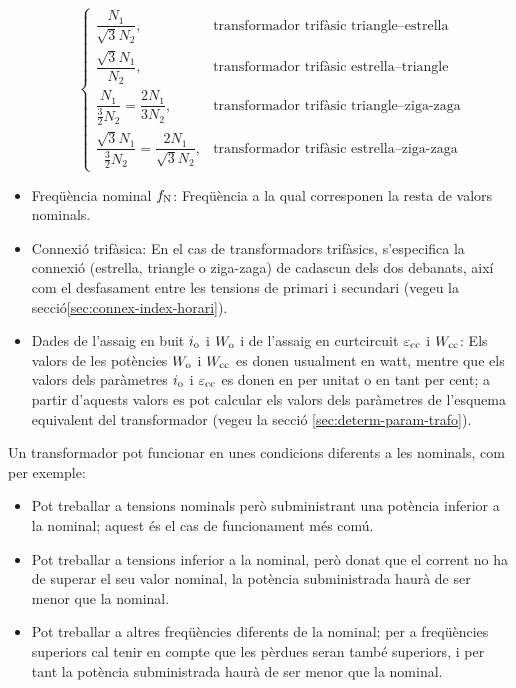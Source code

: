 \begin{itemize}
\begin{equation}
\begin{cases}
        \dfrac{N_1}{\sqrt{3}N_2}, & \text{transformador trifàsic triangle--estrella} \\[0.4cm]
        \dfrac{\sqrt{3}N_1}{N_2}, & \text{transformador trifàsic estrella--triangle} \\[0.4cm]
        \dfrac{N_1}{\frac{3}{2}N_2} = \dfrac{2 N_1}{3 N_2}, & \text{transformador trifàsic triangle--ziga-zaga} \\[0.4cm]
        \dfrac{\sqrt{3}N_1}{\frac{3}{2}N_2} = \dfrac{2 N_1}{\sqrt{3} N_2}, & \text{transformador trifàsic estrella--ziga-zaga}
         \end{cases}
       \end{equation}
   \item Freqüència nominal $f_\mathrm{N}$: Freqüència a la qual corresponen la resta de valors nominals.
   \item Connexió trifàsica: En el cas de transformadors trifàsics, s'especifica la connexió (estrella, triangle o ziga-zaga) de cadascun dels dos debanats, així com el desfasament entre les tensions de primari i secundari (vegeu la secció\vref{sec:connex-index-horari}).
   \item Dades de l'assaig en buit $i_\mathrm{o}$ i $W_\mathrm{o}$ i de l'assaig en curtcircuit $\varepsilon_\mathrm{cc}$ i $W_\mathrm{cc}$: Els valors de les potències $W_\mathrm{o}$ i $W_\mathrm{cc}$ es donen
usualment en watt, mentre que els valors dels paràmetres $i_\mathrm{o}$
i $\varepsilon_\mathrm{cc}$ es donen en per unitat o en tant per cent; a partir d'aquests valors es pot calcular els valors dels paràmetres de l'esquema equivalent del transformador  (vegeu la secció \vref{sec:determ-param-trafo}).
\end{itemize}

Un transformador pot funcionar en unes condicions diferents a les nominals, com per exemple:
\begin{itemize}
   \item Pot treballar a tensions nominals però subministrant una potència inferior a la nominal; aquest és el cas de funcionament més comú.
   \item Pot treballar a tensions inferior a la nominal, però donat que el corrent no ha de superar el seu valor nominal, la potència subministrada haurà de ser menor que la nominal.
   \item Pot treballar a altres freqüències diferents de la nominal; per a freqüències superiors cal tenir en compte que les pèrdues seran també superiors, i per tant la potència subministrada haurà de ser menor que la nominal.
\end{itemize}

